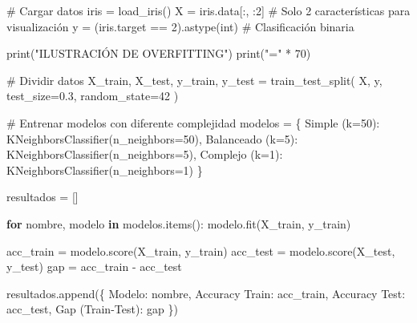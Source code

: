 \documentclass[
  doc,
  floatsintext,
  longtable,
  a4paper,
  nolmodern,
  notxfonts,
  notimes,
  12pt,
  colorlinks=true,linkcolor=blue,citecolor=blue,urlcolor=blue]{apa7}
\newenvironment{Shaded}{\begin{snugshade}}{\end{snugshade}}
\newcommand{\BuiltInTok}[1]{\textcolor[rgb]{0.00,0.23,0.31}{#1}}
\newcommand{\CommentTok}[1]{\textcolor[rgb]{0.37,0.37,0.37}{#1}}
\newcommand{\ControlFlowTok}[1]{\textcolor[rgb]{0.00,0.23,0.31}{\textbf{#1}}}
\newcommand{\DecValTok}[1]{\textcolor[rgb]{0.68,0.00,0.00}{#1}}
\newcommand{\FloatTok}[1]{\textcolor[rgb]{0.68,0.00,0.00}{#1}}
\newcommand{\KeywordTok}[1]{\textcolor[rgb]{0.00,0.23,0.31}{\textbf{#1}}}
\newcommand{\NormalTok}[1]{\textcolor[rgb]{0.00,0.23,0.31}{#1}}
\newcommand{\OperatorTok}[1]{\textcolor[rgb]{0.37,0.37,0.37}{#1}}
\newcommand{\StringTok}[1]{\textcolor[rgb]{0.13,0.47,0.30}{#1}}
\begin{document}
\begin{Shaded}
\begin{Highlighting}[]
\CommentTok{\# Cargar datos}
\NormalTok{iris }\OperatorTok{=}\NormalTok{ load\_iris()}
\NormalTok{X }\OperatorTok{=}\NormalTok{ iris.data[:, :}\DecValTok{2}\NormalTok{]  }\CommentTok{\# Solo 2 características para visualización}
\NormalTok{y }\OperatorTok{=}\NormalTok{ (iris.target }\OperatorTok{==} \DecValTok{2}\NormalTok{).astype(}\BuiltInTok{int}\NormalTok{)  }\CommentTok{\# Clasificación binaria}

\BuiltInTok{print}\NormalTok{(}\StringTok{"ILUSTRACIÓN DE OVERFITTING"}\NormalTok{)}
\BuiltInTok{print}\NormalTok{(}\StringTok{"="} \OperatorTok{*} \DecValTok{70}\NormalTok{)}

\CommentTok{\# Dividir datos}
\NormalTok{X\_train, X\_test, y\_train, y\_test }\OperatorTok{=}\NormalTok{ train\_test\_split(}
\NormalTok{    X, y, test\_size}\OperatorTok{=}\FloatTok{0.3}\NormalTok{, random\_state}\OperatorTok{=}\DecValTok{42}
\NormalTok{)}

\CommentTok{\# Entrenar modelos con diferente complejidad}
\NormalTok{modelos }\OperatorTok{=}\NormalTok{ \{}
    \StringTok{\textquotesingle{}Simple (k=50)\textquotesingle{}}\NormalTok{: KNeighborsClassifier(n\_neighbors}\OperatorTok{=}\DecValTok{50}\NormalTok{),}
    \StringTok{\textquotesingle{}Balanceado (k=5)\textquotesingle{}}\NormalTok{: KNeighborsClassifier(n\_neighbors}\OperatorTok{=}\DecValTok{5}\NormalTok{),}
    \StringTok{\textquotesingle{}Complejo (k=1)\textquotesingle{}}\NormalTok{: KNeighborsClassifier(n\_neighbors}\OperatorTok{=}\DecValTok{1}\NormalTok{)}
\NormalTok{\}}

\NormalTok{resultados }\OperatorTok{=}\NormalTok{ []}

\ControlFlowTok{for}\NormalTok{ nombre, modelo }\KeywordTok{in}\NormalTok{ modelos.items():}
\NormalTok{    modelo.fit(X\_train, y\_train)}
    
\NormalTok{    acc\_train }\OperatorTok{=}\NormalTok{ modelo.score(X\_train, y\_train)}
\NormalTok{    acc\_test }\OperatorTok{=}\NormalTok{ modelo.score(X\_test, y\_test)}
\NormalTok{    gap }\OperatorTok{=}\NormalTok{ acc\_train }\OperatorTok{{-}}\NormalTok{ acc\_test}
    
\NormalTok{    resultados.append(\{}
        \StringTok{\textquotesingle{}Modelo\textquotesingle{}}\NormalTok{: nombre,}
        \StringTok{\textquotesingle{}Accuracy Train\textquotesingle{}}\NormalTok{: acc\_train,}
        \StringTok{\textquotesingle{}Accuracy Test\textquotesingle{}}\NormalTok{: acc\_test,}
        \StringTok{\textquotesingle{}Gap (Train{-}Test)\textquotesingle{}}\NormalTok{: gap}
\NormalTok{    \})}
    

\end{Highlighting}
\end{Shaded}
\end{document}
